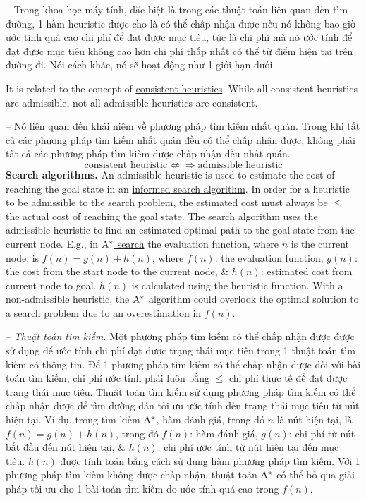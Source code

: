 \documentclass{article}
\begin{document}
-- Trong khoa học máy tính, đặc biệt là trong các thuật toán liên quan đến tìm đường, 1 hàm heuristic được cho là có thể chấp nhận được nếu nó không bao giờ ước tính quá cao chi phí để đạt được mục tiêu, tức là chi phí mà nó ước tính để đạt được mục tiêu không cao hơn chi phí thấp nhất có thể từ điểm hiện tại trên đường đi. Nói cách khác, nó sẽ hoạt động như 1 giới hạn dưới.

It is related to the concept of \href{https://en.wikipedia.org/wiki/Consistent_heuristic}{consistent heuristics}. While all consistent heuristics are admissible, not all admissible heuristics are consistent.

-- Nó liên quan đến khái niệm về phương pháp tìm kiếm nhất quán. Trong khi tất cả các phương pháp tìm kiếm nhất quán đều có thể chấp nhận được, không phải tất cả các phương pháp tìm kiếm được chấp nhận đều nhất quán.
\begin{equation*}
	\mbox{consistent heuristic}\not\Leftarrow\Rightarrow\mbox{admissible heuristic}
\end{equation*}
{\bf Search algorithms.} An admissible heuristic is used to estimate the cost of reaching the goal state in an \href{https://en.wikipedia.org/wiki/Informed_search_algorithm}{informed search algorithm}. In order for a heuristic to be admissible to the search problem, the estimated cost must always be $\le$ the actual cost of reaching the goal state. The search algorithm uses the admissible heuristic to find an estimated optimal path to the goal state from the current node. E.g., in \href{https://en.wikipedia.org/wiki/A*_search}{$\rm A^\star$ search} the evaluation function, where $n$ is the current node, is $f(n) = g(n) + h(n)$, where $f(n)$: the evaluation function, $g(n)$: the cost from the start node to the current node, \& $h(n)$: estimated cost from current node to goal. $h(n)$ is calculated using the heuristic function. With a non-admissible heuristic, the $\rm A^\star$ algorithm could overlook the optimal solution to a search problem due to an overestimation in $f(n)$.

-- {\it Thuật toán tìm kiếm.} Một phương pháp tìm kiếm có thể chấp nhận được được sử dụng để ước tính chi phí đạt được trạng thái mục tiêu trong 1 thuật toán tìm kiếm có thông tin. Để 1 phương pháp tìm kiếm có thể chấp nhận được đối với bài toán tìm kiếm, chi phí ước tính phải luôn bằng $\le$ chi phí thực tế để đạt được trạng thái mục tiêu. Thuật toán tìm kiếm sử dụng phương pháp tìm kiếm có thể chấp nhận được để tìm đường dẫn tối ưu ước tính đến trạng thái mục tiêu từ nút hiện tại. Ví dụ, trong tìm kiếm $\rm A^\star$, hàm đánh giá, trong đó $n$ là nút hiện tại, là $f(n) = g(n) + h(n)$, trong đó $f(n)$: hàm đánh giá, $g(n)$: chi phí từ nút bắt đầu đến nút hiện tại, \& $h(n)$: chi phí ước tính từ nút hiện tại đến mục tiêu. $h(n)$ được tính toán bằng cách sử dụng hàm phương pháp tìm kiếm. Với 1 phương pháp tìm kiếm không được chấp nhận, thuật toán $\rm A^\star$ có thể bỏ qua giải pháp tối ưu cho 1 bài toán tìm kiếm do ước tính quá cao trong $f(n)$.
\end{document}
